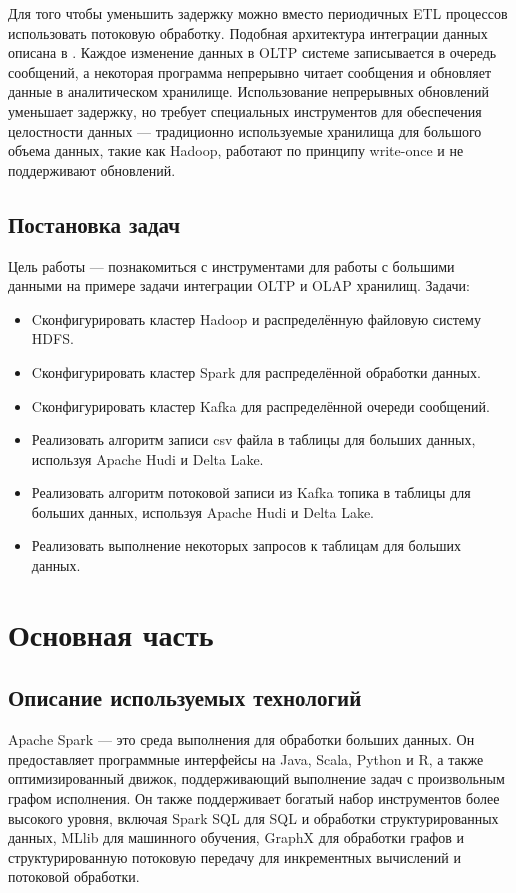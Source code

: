 \documentclass[%
bachelor,    %
subf,        %
href,        %
colorlinks,  %
]{disser}
\begin{document}
	Для того чтобы уменьшить задержку можно вместо периодичных ETL процессов использовать потоковую обработку.
	Подобная архитектура интеграции данных описана в \cite{streaming_integration} \cite{streaming_integration_2}.
	Каждое изменение данных в OLTP системе записывается в очередь сообщений, а некоторая программа непрерывно читает сообщения и обновляет данные в аналитическом хранилище.
	Использование непрерывных обновлений уменьшает задержку, но требует специальных инструментов для обеспечения целостности данных --- традиционно используемые хранилища для большого объема данных, такие как Hadoop, работают по принципу write-once и не поддерживают обновлений.
	
	\subsection{Постановка задач}
    Цель работы --- познакомиться с инструментами для работы с большими данными на примере задачи интеграции OLTP и OLAP хранилищ.
    Задачи:
	\begin{itemize}
		\item Cконфигурировать кластер Hadoop и распределённую файловую систему HDFS.
		\item Cконфигурировать кластер Spark для распределённой обработки данных.
		\item Cконфигурировать кластер Kafka для распределённой очереди сообщений.				
		\item Реализовать алгоритм записи csv файла в таблицы для больших данных, используя Apache Hudi и Delta Lake.
		\item Реализовать алгоритм потоковой записи из Kafka топика в таблицы для больших данных, используя Apache Hudi и Delta Lake.
		\item Реализовать выполнение некоторых запросов к таблицам для больших данных.		
		
	\end{itemize}
\newpage
\section{Основная часть}
\subsection{Описание используемых технологий}
Apache Spark --- это среда выполнения для обработки больших данных. Он предоставляет программные интерфейсы на Java, Scala, Python и R, а также оптимизированный движок, поддерживающий выполнение задач с произвольным графом исполнения. Он также поддерживает богатый набор инструментов более высокого уровня, включая Spark SQL для SQL и обработки структурированных данных, MLlib для машинного обучения, GraphX для обработки графов и структурированную потоковую передачу для инкрементных вычислений и потоковой обработки.\cite{spark}
\end{document}
